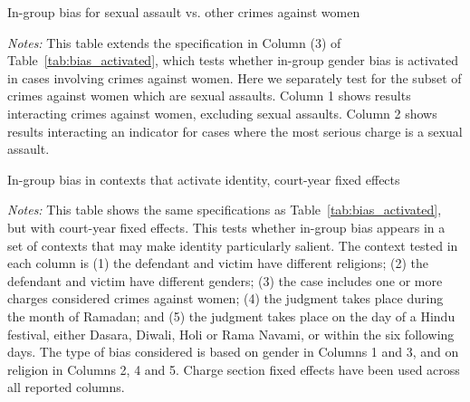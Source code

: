 \documentclass[12pt,english]{article}
\newcommand{\HOME}{\string~}
\newcommand{\curpath}{\HOME/ddl/justice-overleaf}
\newcommand{\curpath}{.}
\begin{document}
\begin{appendices}
  \newpage
  \begin{table}[h!]%
    \begin{center}
        \caption{In-group bias for sexual assault vs. other crimes against women}
      \label{tab:crimes_against_women_cm}
          \resizebox{\linewidth}{!}{
        
        }
  \begin{minipage}{\textwidth}
    \footnotesize \emph{Notes:}
    This table extends the specification in Column (3) of Table~\ref{tab:bias_activated}, which tests whether in-group gender bias is activated in cases involving crimes against women. Here we separately test for the subset of crimes against women which are sexual assaults. Column 1 shows results interacting crimes against women, excluding sexual assaults. Column 2 shows results interacting an indicator for cases where the most serious charge is a sexual assault. \\ 
   \end{minipage}
      \end{center}
    \end{table}

  \newpage

  \begin{table}[h!]%
    \begin{center}
        \caption{In-group bias in contexts that activate identity, court-year fixed effects}
      \label{tab:bias_activated_cy}
          \resizebox{\linewidth}{!}{
        
        }
  \begin{minipage}{\textwidth}
    \footnotesize \emph{Notes:}
This table shows the same specifications as Table~\ref{tab:bias_activated}, but with court-year fixed effects. This tests whether in-group bias appears in a set of contexts that may make identity particularly salient. The context tested in each column is (1) the defendant and victim have different religions; (2) the defendant and victim have different genders; (3) the case includes one or more charges considered crimes against women; (4) the judgment takes place during the month of Ramadan; and (5) the judgment takes place on the day of a Hindu festival, either Dasara, Diwali, Holi or Rama Navami, or within the six following days. The type of bias considered is based on gender in Columns 1 and 3, and on religion in Columns 2, 4 and 5. Charge section fixed effects have been used across all reported columns. \\ 
   \end{minipage}
      \end{center}
    \end{table}


\end{appendices}
\end{document}
